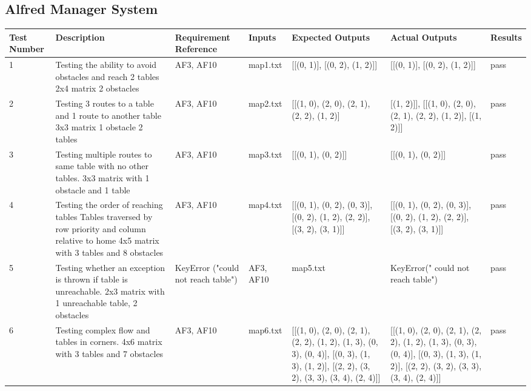 \documentclass [10pt]{article}
\begin{document}
\subsection {Alfred Manager System}

\begin{longtable}{| p{} | p{} | p{} | p{} | p{} | p{} | p{} |}\hline 
	\rowcolor{tableCell}\textbf{Test Number} & \textbf{Description} & \textbf{Requirement Reference} & \textbf{Inputs} & \textbf{Expected Outputs} & \textbf{Actual Outputs}& \textbf{Results} \\ \hline
	1 &  Testing the ability to avoid obstacles and reach 2 tables 2x4 matrix 2 obstacles &  AF3, AF10 &  map1.txt &  [[(0, 1)], [(0, 2), (1, 2)]] &  [[(0, 1)], [(0, 2), (1, 2)]] &  pass
	\\ \hline  
	2 &  Testing 3 routes to a table and 1 route to another table 3x3 matrix 1 obstacle 2 tables &  AF3, AF10 &  map2.txt & [[(1, 0), (2, 0), (2, 1), (2, 2), (1, 2)] &  [(1, 2)]], [[(1, 0), (2, 0), (2, 1), (2, 2), (1, 2)], [(1, 2)]] &  pass
	\\ \hline  
	3 &  Testing multiple routes to same table with no other tables. 3x3 matrix with 1 obstacle and 1 table &  AF3, AF10 &  map3.txt & [[(0, 1), (0, 2)]] &  [[(0, 1), (0, 2)]] &  pass
	\\ \hline  
	4 &  Testing the order of reaching tables Tables traversed by row priority and column relative to home 4x5 matrix with 3 tables and 8 obstacles &  AF3, AF10 &  map4.txt & [[(0, 1), (0, 2), (0, 3)], [(0, 2), (1, 2), (2, 2)], [(3, 2), (3, 1)]] &  [[(0, 1), (0, 2), (0, 3)], [(0, 2), (1, 2), (2, 2)], [(3, 2), (3, 1)]] &  pass
	\\ \hline  
	5 &  Testing whether an exception is thrown if table is unreachable. 2x3 matrix with 1 unreachable table, 2 obstacles &   KeyError ("could not reach table") &  AF3, AF10 &  map5.txt &  KeyError(" could not reach table") &  pass
	\\ \hline  
	6 &  Testing complex flow and tables in corners. 4x6 matrix with 3 tables and 7 obstacles &  AF3, AF10 &  map6.txt & [[(1, 0), (2, 0), (2, 1), (2, 2), (1, 2), (1, 3), (0, 3), (0, 4)], [(0, 3), (1, 3), (1, 2)], [(2, 2), (3, 2), (3, 3), (3, 4), (2, 4)]] &  [[(1, 0), (2, 0), (2, 1), (2, 2), (1, 2), (1, 3), (0, 3), (0, 4)], [(0, 3), (1, 3), (1, 2)], [(2, 2), (3, 2), (3, 3), (3, 4), (2, 4)]] &  pass
	\\ \hline  

\end{longtable}
\end{document}
